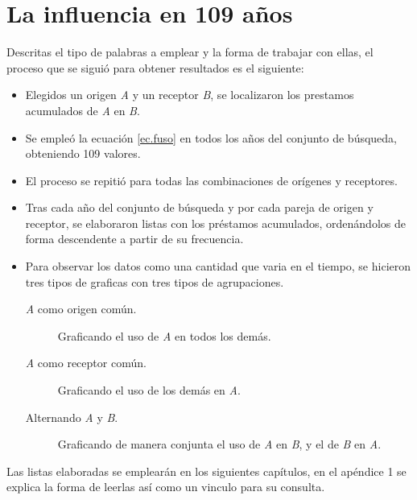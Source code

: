 \section{La influencia en 109 años}

Descritas el tipo de palabras a emplear y la forma de trabajar con ellas, el proceso que se siguió para obtener resultados es el siguiente: 

\begin{itemize}
	
	\item Elegidos un  origen \textit{A} y un receptor \textit{B}, se localizaron los prestamos acumulados de \textit{A} en \textit{B}.
	
	\item Se empleó la ecuación \ref{ec.fuso} en todos los años del conjunto de búsqueda, obteniendo 109 valores. 
	
	\item El proceso se repitió para todas las combinaciones de orígenes y receptores.
	
	\item  Tras cada año del conjunto de búsqueda y por cada pareja de origen y receptor, se elaboraron  listas con los préstamos acumulados, ordenándolos de forma descendente a partir de su frecuencia. 
	
	\item Para observar los datos como una cantidad que varia en el tiempo, se  hicieron tres tipos de graficas con tres tipos de agrupaciones.
	
	\begin{description}
		
		\item[\textit{A} como origen común.] Graficando el uso de \textit{A} en todos los demás.
		
		\item[\textit{A} como receptor común.] Graficando el uso de los demás en \textit{A}.
		
		\item[Alternando \textit{A} y \textit{B}.]  Graficando de manera conjunta el uso de \textit{A} en \textit{B}, y el de \textit{B} en \textit{A}.
				
	\end{description}	

\end{itemize}

Las listas elaboradas se emplearán en los siguientes capítulos, en el apéndice 1 se explica la forma de leerlas así como un vinculo para su consulta. 


